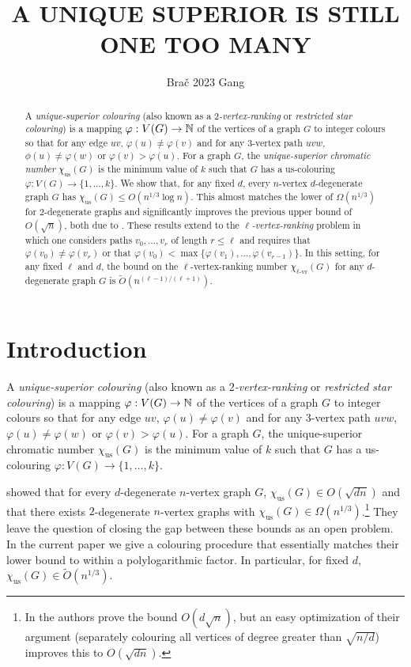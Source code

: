 \documentclass{patmorin}
\title{\MakeUppercase{A Unique Superior is Still One Too Many}}
\author{Bra\v{c} 2023 Gang}
\newcommand{\defin}[1]{\emph{\color{brightmaroon}#1}}
\newcommand{\rn}[1]{\chi_{\operatorname{#1-vr}}}
\newcommand{\trn}{\chi_{\mathrm{us}}}
\newcommand{\lrn}{\rn{\ell}}
\begin{document}
\maketitle

\begin{abstract}
  A \defin{unique-superior colouring} (also known as a \defin{$2$-vertex-ranking} or \defin{restricted star colouring}) is a mapping $\varphi:V(G)\to\mathbb{N}$ of the vertices of a graph $G$ to integer colours so that for any edge $uv$, $\varphi(u)\neq \varphi(v)$ and for any $3$-vertex path $uvw$, $\phi(u)\neq\varphi(w)$ or $\varphi(v)>\varphi(u)$.  For a graph $G$, the \defin{unique-superior chromatic number} $\trn(G)$ is the minimum value of $k$ such that $G$ has a us-colouring $\varphi:V(G)\to\{1,\ldots,k\}$.  We show that, for any fixed $d$, every $n$-vertex $d$-degenerate graph $G$ has $\trn(G) \le O(n^{1/3}\log n)$.  This almost matches the lower of $\Omega(n^{1/3})$ for $2$-degenerate graphs and significantly improves the previous upper bound of $O(\sqrt{n})$, both due to \citet{karpas.neiman.ea:on}. These results extend to the \defin{$\ell$-vertex-ranking} problem in which one considers paths $v_0,\ldots,v_r$ of length $r\le \ell$ and requires that $\varphi(v_0)\neq\varphi(v_r)$ or that $\varphi(v_0)<\max\{\varphi(v_1),\ldots,\varphi(v_{r-1})\}$.  In this setting, for any fixed $\ell$ and $d$, the bound on the $\ell$-vertex-ranking number $\lrn(G)$ for any $d$-degenerate graph $G$ is $\tilde{O}(n^{(\ell-1)/(\ell+1)})$.
\end{abstract}


%



\section{Introduction}

A \defin{unique-superior colouring} (also known as a \defin{$2$-vertex-ranking} or \defin{restricted star colouring}) is a mapping $\varphi:V(G)\to\mathbb{N}$ of the vertices of a graph $G$ to integer colours so that for any edge $uv$, $\varphi(u)\neq \varphi(v)$ and for any $3$-vertex path $uvw$, $\varphi(u)\neq\varphi(w)$ or $\varphi(v)>\varphi(u)$.  For a graph $G$, the unique-superior chromatic number $\trn(G)$ is the minimum value of $k$ such that $G$ has a us-colouring $\varphi:V(G)\to\{1,\ldots,k\}$.

\citet{karpas.neiman.ea:on} showed that for every $d$-degenerate $n$-vertex graph $G$, $\trn(G)\in O(\sqrt{dn})$ and that there exists $2$-degenerate $n$-vertex graphs with $\trn(G)\in\Omega(n^{1/3})$.\footnote{In \cite[Theorem~6.2]{karpas.neiman.ea:on} the authors prove the bound $O(d\sqrt{n})$, but an easy optimization of their argument (separately colouring all vertices of degree greater than $\sqrt{n/d}$) improves this to $O(\sqrt{dn})$.}  They leave the question of closing the gap between these bounds as an open problem. In the current paper we give a colouring procedure that essentially matches their lower bound to within a polylogarithmic factor.  In particular, for fixed $d$, $\trn(G)\in \tilde{O}(n^{1/3})$.
\end{document}
